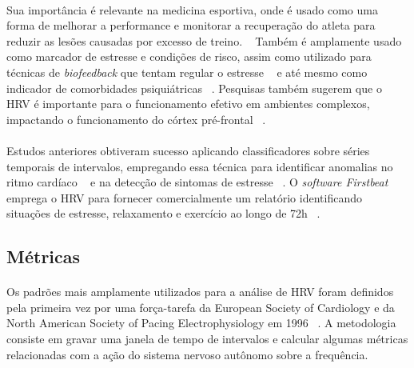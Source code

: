             \paragraph{} Sua importância é relevante na medicina esportiva, onde é usado como uma forma de melhorar a performance e monitorar a recuperação do atleta para reduzir as lesões causadas por excesso de treino. ~\cite{Oweis2014QRSSurvey, Shaffer2017AnNorms., Plews2017ComparisonMethods} Também é amplamente usado como marcador de estresse e condições de risco, assim como utilizado para técnicas de \textit{biofeedback} que tentam regular o estresse ~\cite{Vanitha2014HierarchicalVariability, Bernardi2000EffectsVariability, Prinsloo2011TheStress, Sasaki2014ConsciouslyActivity,  Quintana2016GuidelinesCommunication} e até mesmo como indicador de comorbidades psiquiátricas ~\cite{Quintana2016GuidelinesCommunication}. Pesquisas também sugerem que o HRV é importante para o funcionamento efetivo em ambientes complexos, impactando o funcionamento do córtex pré-frontal ~\cite{Hansen2004HeartDetraining, Luque-Casado2013CognitiveLevel}.
            
            \paragraph{} Estudos anteriores obtiveram sucesso aplicando classificadores sobre séries temporais de intervalos, empregando essa técnica para identificar anomalias no ritmo cardíaco ~\cite{Kampouraki2009HeartbeatMachines} e na detecção de sintomas de estresse ~\cite{Vanitha2014HierarchicalVariability, Sami2004ArtefactData}. O \textit{software Firstbeat} emprega o HRV para fornecer comercialmente um relatório identificando situações de estresse, relaxamento e exercício ao longo de 72h ~\cite{FirstbeatTechnologiesLtd.StressVariability}.
            
        \subsection {Métricas}
        
            \paragraph{} Os padrões mais amplamente utilizados para a análise de HRV foram definidos pela primeira vez por uma força-tarefa da European Society of Cardiology e da North American Society of Pacing Electrophysiology em 1996 ~\cite{TaskForceoftheEuropeanSocietyofCardiologytheNorthAmericanSocietyofPacing1996HeartUse}. A metodologia consiste em gravar uma janela de tempo de intervalos e calcular algumas métricas relacionadas com a ação do sistema nervoso autônomo sobre a frequência. 
            
